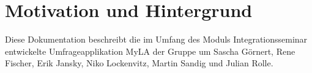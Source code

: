 \section{Motivation und Hintergrund}

Diese Dokumentation beschreibt die im Umfang des Moduls Integrationsseminar entwickelte Umfrageapplikation MyLA der Gruppe um Sascha Görnert, Rene Fischer, Erik Jansky, Niko Lockenvitz, Martin Sandig und Julian Rolle.

